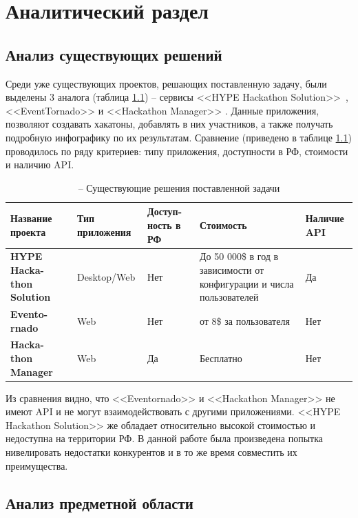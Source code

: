 \chapter{Аналитический раздел}

\section{Анализ существующих решений}

Среди уже существующих проектов, решающих поставленную задачу, были выделены 3 аналога (таблица \ref{decisions}) -- сервисы <<HYPE Hackathon Solution>>~\cite{hype}, <<EventTornado>> \cite{eventornado} и <<Hackathon Manager>> \cite{hack_manager}. Данные приложения, позволяют создавать хакатоны, добавлять в них участников, а также получать подробную инфографику по их результатам. Сравнение (приведено в таблице \ref{decisions}) проводилось по ряду критериев: типу приложения, доступности в РФ, стоимости и наличию API.

\begin{table}[H]
	\centering
	\caption{-- Существующие решения поставленной задачи}
	\label{decisions}
	\begin{tabular}{|p{2.3cm}|p{3.3cm}|p{3cm}|p{3cm}|p{3.1cm}|}
		\hline
		\textbf{Название проекта} & \textbf{Тип приложения} & \textbf{Доступ- ность в РФ} & \textbf{Стоимость} & \textbf{Наличие API}\\
		\hline 
		\textbf{HYPE Hacka- thon Solution} & Desktop/Web & Нет & До 50 000\$ в год в зависимости от конфигурации и числа пользователей & Да\\
		\hline
		\textbf{Evento- rnado} & Web & Нет & от 8\$ за пользователя & Нет\\
		\hline
		\textbf{Hacka- thon Manager} & Web & Да & Бесплатно & Нет  \\
		\hline
	\end{tabular}
\end{table}

Из сравнения видно, что <<Eventornado>> и <<Hackathon Manager>> не имеют API и не могут взаимодействовать с другими приложениями. <<HYPE Hackathon Solution>> же обладает относительно высокой стоимостью и недоступна на территории РФ. В данной работе была произведена попытка нивелировать недостатки конкурентов и в то же время совместить их преимущества.

\section{Анализ предметной области}

